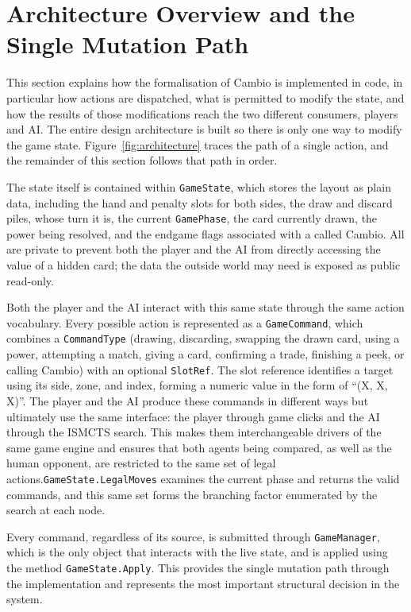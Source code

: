 \documentclass[12pt,a4paper,oneside]{report}
\begin{document}
\section{Architecture Overview and the Single Mutation Path}
\label{sec:mutation-path}

This section explains how the formalisation of Cambio is implemented in code, in particular how actions are dispatched, what is permitted to modify the state, and how the results of those modifications reach the two different consumers, players and AI. The entire design architecture is built so there is only one way to modify the game state. Figure~\ref{fig:architecture} traces the path of a single action, and the remainder of this section follows that path in order.

The state itself is contained within \texttt{GameState}, which stores the layout as plain data, including the hand and penalty slots for both sides, the draw and discard piles, whose turn it is, the current \texttt{GamePhase}, the card currently drawn, the power being resolved, and the endgame flags associated with a called Cambio. All are private to prevent both the player and the AI from directly accessing the value of a hidden card; the data the outside world may need is exposed as public read-only.

Both the player and the AI interact with this same state through the same action vocabulary. Every possible action is represented as a \texttt{GameCommand}, which combines a \texttt{CommandType} (drawing, discarding, swapping the drawn card, using a power, attempting a match, giving a card, confirming a trade, finishing a peek, or calling Cambio) with an optional \texttt{SlotRef}. The slot reference identifies a target using its side, zone, and index, forming a numeric value in the form of  “(X, X, X)”. The player and the AI produce these commands in different ways but ultimately use the same interface: the player through game clicks and the AI through the ISMCTS search. This makes them interchangeable drivers of the same game engine and ensures that both agents being compared, as well as the human opponent, are restricted to the same set of legal actions.\texttt{GameState.LegalMoves} examines the current phase and returns the valid commands, and this same set forms the branching factor enumerated by the search at each node.

Every command, regardless of its source, is submitted through \texttt{GameManager}, which is the only object that interacts with the live state, and is applied using the method  \texttt{GameState.Apply}. This provides the single mutation path through the implementation and represents the most important structural decision in the system. 
\end{document}
